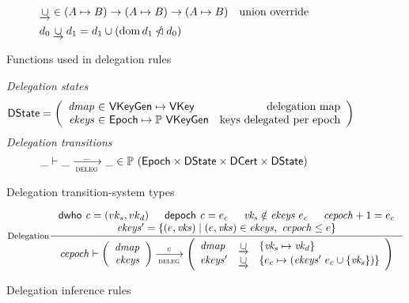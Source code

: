 \begin{figure}
  \begin{align*}
    & \mathbin{\underrightarrow\cup} \in (A \mapsto B) \to (A \mapsto B) \to (A \mapsto B)
    & \text{union override}\\
    & d_0 \mathbin{\underrightarrow\cup} d_1 = d_1 \cup (\operatorname{dom} d_1 \mathbin{\slashed{\lhd}} d_0)
  \end{align*}
  \caption{Functions used in delegation rules}
  \label{fig:funcs:delegation}
\end{figure}

\begin{figure}
  \emph{Delegation states}
  \begin{align*}
    & \DState
      = \left(
        \begin{array}{r@{~\in~}lr}
          \var{dmap} & \VKeyGen \mapsto \VKey & \text{delegation map}\\
          \var{ekeys} & \Epoch \mapsto \powerset{\VKeyGen} & \text{keys delegated per epoch}
        \end{array}\right)
  \end{align*}
  \emph{Delegation transitions}
  \begin{equation*}
    \_ \vdash \_ \trans{deleg}{\_} \_ \in
      \powerset (\Epoch \times \DState \times \DCert \times \DState)
    \end{equation*}
  \caption{Delegation transition-system types}
  \label{fig:ts-types:delegation}
\end{figure}

\begin{figure}
  \begin{equation}\label{eq:delegation}
    \inference[Delegation]
    {\dwho{c} = (vk_s, vk_d) & \depoch{c} = e_c & \var{vk_s} \notin \var{ekeys}~e_c & \var{cepoch} + 1 = e_c\\
      \var{ekeys'} = \{ (e, \var{vks})  \mid (e, \var{vks}) \in \var{ekeys},~  \var{cepoch} \leq e \}
    }
    {
      \var{cepoch} \vdash
      \left(
      \begin{array}{r}
        \var{dmap}\\
        \var{ekeys}
      \end{array}
      \right)
      \trans{deleg}{c}
      \left(
      \begin{array}{lcl}
        \var{dmap} & \unionoverride & \{\var{vk_s} \mapsto \var{vk_d}\}\\
        \var{ekeys'} & \unionoverride & \{e_c \mapsto (\var{ekeys'}~e_c \cup \{\var{vk_s}\})\}
      \end{array}
      \right)
    }
  \end{equation}
  \caption{Delegation inference rules}
  \label{fig:rules:delegation}
\end{figure}

